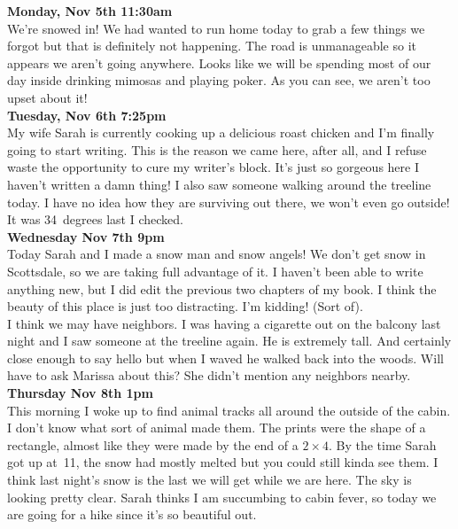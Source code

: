 \documentclass[a5paper]{scrartcl}
\begin{document}
\textbf{Monday, Nov 5th 11:30am}
\\


We're snowed in! We had wanted to run home today to grab a few things we forgot but that is definitely not happening. The road is unmanageable so it appears we aren't going anywhere. Looks like we will be spending most of our day inside drinking mimosas and playing poker. As you can see, we aren't too upset about it!\\


\textbf{Tuesday, Nov 6th   7:25pm}
\\


My wife Sarah is currently cooking up a delicious roast chicken and I'm finally going to start writing. This is the reason we came here, after all, and I refuse waste the opportunity to cure my writer's block. It's just so gorgeous here I haven't written a damn thing! 
I also saw someone walking around the treeline today. I have no idea how they are surviving out there, we won't even go outside! It was 34~degrees last I checked.\\


\textbf{Wednesday Nov 7th 9pm}
\\


Today Sarah and I made a snow man and snow angels! We don't get snow in Scottsdale, so we are taking full advantage of it. I haven't been able to write anything new, but I did edit the previous two chapters of my book.  I think the beauty of this place is just too distracting. I'm kidding! (Sort of).\\


I think we may have neighbors. I was having a cigarette out on the balcony last night and I saw someone at the treeline again. He is extremely tall.  And certainly close enough to say hello but when I waved he walked back into the woods. Will have to ask Marissa about this? She didn't mention any neighbors nearby.\\


\textbf{Thursday Nov 8th 1pm}
\\


This morning I woke up to find animal tracks all around the outside of the cabin. I don't know what sort of animal made them. The prints were the shape of a rectangle, almost like they were made by the end of a $2 \times 4$. By the time Sarah got up at~11, the snow had mostly melted but you could still kinda see them. I think last night's snow is the last we will get while we are here. The sky is looking pretty clear. Sarah thinks I am succumbing to cabin fever, so today we are going for a hike since it's so beautiful out.\\
\end{document}
